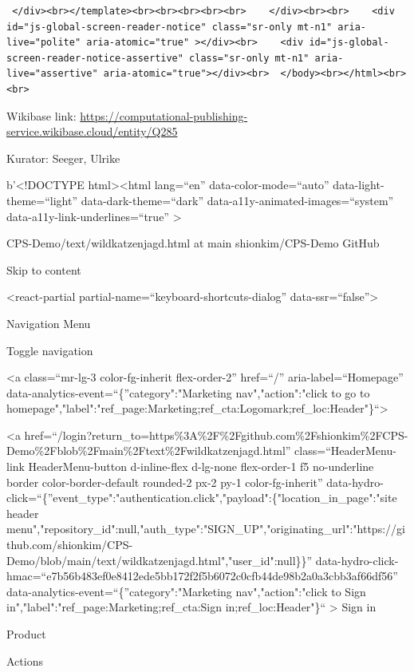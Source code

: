 \documentclass[
  letterpaper,
]{book}
\begin{document}
\begin{verbatim}
 </div><br></template><br><br><br><br><br>    </div><br><br>    <div id="js-global-screen-reader-notice" class="sr-only mt-n1" aria-live="polite" aria-atomic="true" ></div><br>    <div id="js-global-screen-reader-notice-assertive" class="sr-only mt-n1" aria-live="assertive" aria-atomic="true"></div><br>  </body><br></html><br><br>
\end{verbatim}

Wikibase link:
\url{https://computational-publishing-service.wikibase.cloud/entity/Q285}

Kurator: Seeger, Ulrike

b'\textless!DOCTYPE html\textgreater{}\textless html lang=``en''
data-color-mode=``auto'' data-light-theme=``light''
data-dark-theme=``dark'' data-a11y-animated-images=``system''
data-a11y-link-underlines=``true'' \textgreater{}

CPS-Demo/text/wildkatzenjagd.html at main  shionkim/CPS-Demo
 GitHub

Skip to content { {}}

\textless react-partial partial-name=``keyboard-shortcuts-dialog''
data-ssr=``false''\textgreater{}

Navigation Menu

{Toggle navigation}

\textless a class=``mr-lg-3 color-fg-inherit flex-order-2'' href=``/''
aria-label=``Homepage'' data-analytics-event=``\{''category":"Marketing
nav","action":"click to go to
homepage","label":"ref\_page:Marketing;ref\_cta:Logomark;ref\_loc:Header"\}``\textgreater{}

\textless a
href=``/login?return\_to=https\%3A\%2F\%2Fgithub.com\%2Fshionkim\%2FCPS-Demo\%2Fblob\%2Fmain\%2Ftext\%2Fwildkatzenjagd.html''
class=``HeaderMenu-link HeaderMenu-button d-inline-flex d-lg-none
flex-order-1 f5 no-underline border color-border-default rounded-2 px-2
py-1 color-fg-inherit''
data-hydro-click=``\{''event\_type":"authentication.click","payload":\{"location\_in\_page":"site
header
menu","repository\_id":null,"auth\_type":"SIGN\_UP","originating\_url":"https://github.com/shionkim/CPS-Demo/blob/main/text/wildkatzenjagd.html","user\_id":null\}\}''
data-hydro-click-hmac=``e7b56b483ef0e8412ede5bb172f2f5b6072c0cfb44de98b2a0a3cbb3af66df56''
data-analytics-event=``\{''category":"Marketing nav","action":"click to
Sign in","label":"ref\_page:Marketing;ref\_cta:Sign
in;ref\_loc:Header"\}`` \textgreater{} Sign in

Product

Actions
\end{document}
